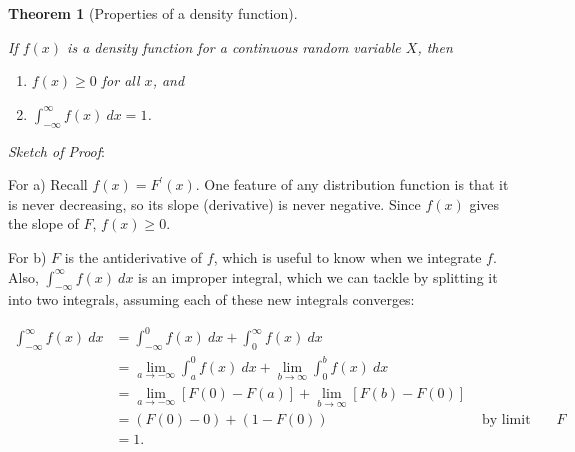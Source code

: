 \documentclass[
]{book}
\providecommand{\tightlist}{%
  \setlength{\itemsep}{0pt}\setlength{\parskip}{0pt}}
\newtheorem{theorem}{Theorem}[chapter]
\theoremstyle{definition}
\theoremstyle{definition}
\theoremstyle{definition}
\theoremstyle{definition}
\theoremstyle{remark}
\begin{document}
\begin{theorem}[Properties of a density function]
\protect\hypertarget{thm:pdf-props}{}\label{thm:pdf-props}

If \(f(x)\) is a density function for a continuous random variable \(X\), then

\begin{enumerate}
\def\labelenumi{\alph{enumi})}
\tightlist
\item
  \(f(x) \geq 0\) for all \(x\), and
\item
  \(\displaystyle \int_{-\infty}^{\infty} f(x)~dx = 1\).
\end{enumerate}

\end{theorem}

\emph{Sketch of Proof}:

For a) Recall \(f(x) = F^\prime(x)\). One feature of any distribution function is that it is never decreasing, so its slope (derivative) is never negative. Since \(f(x)\) gives the slope of \(F\), \(f(x) \geq 0\).

For b) \(F\) is the antiderivative of \(f\), which is useful to know when we integrate \(f\). Also, \(\displaystyle \int_{-\infty}^{\infty} f(x)~dx\) is an improper integral, which we can tackle by splitting it into two integrals, assuming each of these new integrals converges:

\begin{align*}
\int_{-\infty}^{\infty} f(x)~dx &= \int_{-\infty}^{0} f(x)~dx + \int_{0}^{\infty} f(x)~dx  \\
&= \lim_{a \to -\infty} \int_a^0 f(x)~dx + \lim_{b \to \infty} \int_0^b f(x)~dx \\
&=  \lim_{a \to -\infty} \left[F(0)-F(a)\right] + \lim_{b \to \infty} \left[F(b)-F(0)\right] \\
&= (F(0)-0) + (1 - F(0))  & \text{ by limit properties of } F \\
&= 1.
\end{align*}
\end{document}
